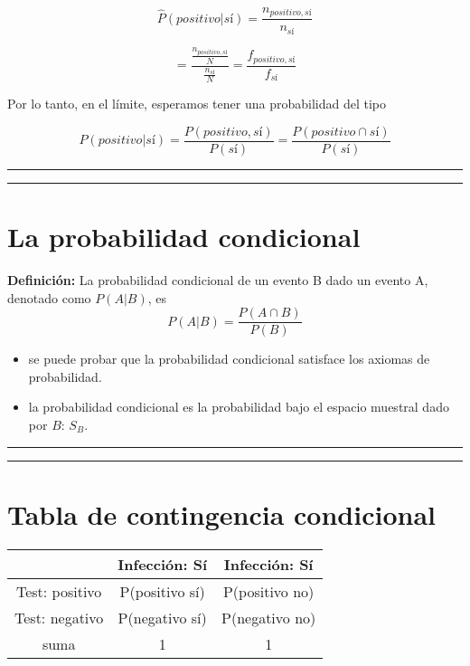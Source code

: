 \documentclass[
]{book}
\providecommand{\tightlist}{%
  \setlength{\itemsep}{0pt}\setlength{\parskip}{0pt}}
\begin{document}
\[\hat{P}(positivo|sí)=\frac{n_{positivo,sí}}{n_{sí}}\]

\[=\frac{\frac{n_{positivo,sí}}{N}}{\frac{n_{sí}}{N}}=\frac{f_{positivo,sí}}{f_{sí}} \]

Por lo tanto, en el límite, esperamos tener una probabilidad del tipo

\[P(positivo|sí)=\frac{P(positivo, sí)}{P(sí)}=\frac{P(positivo \cap sí)}{P(sí)}\]

\begin{center}\rule{0.5\linewidth}{0.5pt}\end{center}

\begin{center}\rule{0.5\linewidth}{0.5pt}\end{center}

\hypertarget{la-probabilidad-condicional-1}{%
\section{La probabilidad condicional}\label{la-probabilidad-condicional-1}}

\textbf{Definición:}
La probabilidad condicional de un evento B dado un evento A, denotado como \(P(A|B)\), es
\[P(A|B) = \frac{P(A\cap B)}{P(B)}\]

\begin{itemize}
\tightlist
\item
  se puede probar que la probabilidad condicional satisface los axiomas de probabilidad.
\item
  la probabilidad condicional es la probabilidad bajo el espacio muestral dado por \(B\): \(S_B\).
\end{itemize}

\begin{center}\rule{0.5\linewidth}{0.5pt}\end{center}

\begin{center}\rule{0.5\linewidth}{0.5pt}\end{center}

\hypertarget{tabla-de-contingencia-condicional}{%
\section{Tabla de contingencia condicional}\label{tabla-de-contingencia-condicional}}

\begin{longtable}[]{@{}ccc@{}}
\toprule
& Infección: Sí & Infección: Sí \\
\midrule
\endhead
Test: positivo & P(positivo {\textbar{}} sí) & P(positivo {\textbar{}} no) \\
Test: negativo & P(negativo {\textbar{}} sí) & P(negativo {\textbar{}} no) \\
suma & 1 & 1 \\
\bottomrule
\end{longtable}
\end{document}
